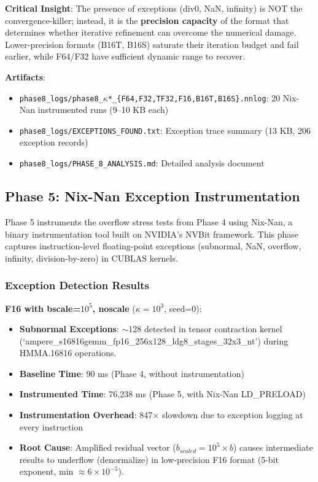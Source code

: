 \documentclass[11pt,a4paper]{article}
\begin{document}
\textbf{Critical Insight}: The presence of exceptions (div0, NaN, infinity) is NOT the convergence-killer; instead, it is the \textbf{precision capacity} of the format that determines whether iterative refinement can overcome the numerical damage. Lower-precision formats (B16T, B16S) saturate their iteration budget and fail earlier, while F64/F32 have sufficient dynamic range to recover.

\textbf{Artifacts}:
\begin{itemize}
  \item \texttt{phase8\_logs/phase8\_$\kappa$*\_\{F64,F32,TF32,F16,B16T,B16S\}.nnlog}: 20 Nix-Nan instrumented runs (9--10 KB each)
  \item \texttt{phase8\_logs/EXCEPTIONS\_FOUND.txt}: Exception trace summary (13 KB, 206 exception records)
  \item \texttt{phase8\_logs/PHASE\_8\_ANALYSIS.md}: Detailed analysis document
\end{itemize}

\subsection{Phase 5: Nix-Nan Exception Instrumentation}

Phase 5 instruments the overflow stress tests from Phase 4 using Nix-Nan, a binary instrumentation tool built on NVIDIA's NVBit framework. This phase captures instruction-level floating-point exceptions (subnormal, NaN, overflow, infinity, division-by-zero) in CUBLAS kernels.

\subsubsection{Exception Detection Results}

\textbf{F16 with bscale=$10^5$, noscale} ($\kappa = 10^3$, seed=0):
\begin{itemize}
  \item \textbf{Subnormal Exceptions}: $\sim$128 detected in tensor contraction kernel (`ampere\_s16816gemm\_fp16\_256x128\_ldg8\_stages\_32x3\_nt') during HMMA.16816 operations.
  \item \textbf{Baseline Time}: 90 ms (Phase 4, without instrumentation)
  \item \textbf{Instrumented Time}: 76,238 ms (Phase 5, with Nix-Nan LD\_PRELOAD)
  \item \textbf{Instrumentation Overhead}: 847$\times$ slowdown due to exception logging at every instruction
  \item \textbf{Root Cause}: Amplified residual vector ($b_{scaled} = 10^5 \times b$) causes intermediate results to underflow (denormalize) in low-precision F16 format (5-bit exponent, min $\approx 6 \times 10^{-5}$).
\end{itemize}
\end{document}
